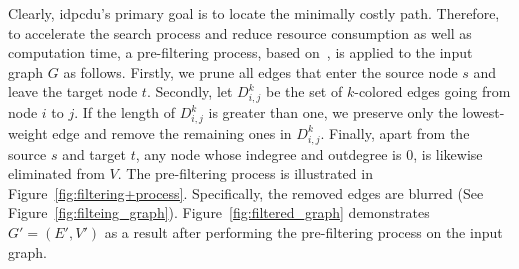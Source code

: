 Clearly, \gls{idpcdu}'s primary goal is to locate the minimally costly path. Therefore, to accelerate the search process and reduce resource consumption as well as computation time, a pre-filtering process, based on~\cite{binh2021two}, is applied to the input graph $G$ as follows. Firstly, we prune all edges that enter the source node $s$ and leave the target node $t$. Secondly, let $D^k_{i,j}$ be the set of $k$-colored edges going from node $i$ to $j$. If the length of $D^k_{i,j}$ is greater than one, we preserve only the lowest-weight edge and remove the remaining ones in $D^k_{i,j}$. Finally, apart from the source $s$ and target $t$, any node whose indegree and outdegree is 0, is likewise eliminated from $V$. 
The pre-filtering process is illustrated in Figure~\ref{fig:filtering+process}. Specifically, the removed edges are blurred (See Figure~\ref{fig:filteing_graph}). Figure~\ref{fig:filtered_graph} demonstrates $G'=(E', V')$ as a result after performing the pre-filtering process on the input graph.


